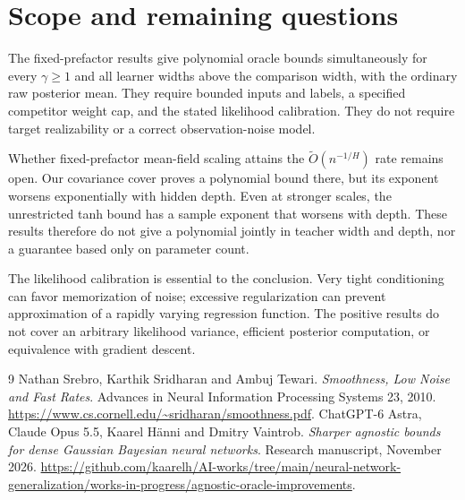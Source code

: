 \documentclass[11pt]{article}
\theoremstyle{remark}\newtheorem{remark}[theorem]{Remark}
\begin{document}















\section{Scope and remaining questions}
The fixed-prefactor results give polynomial oracle bounds simultaneously for every $\gamma\ge1$ and all learner widths above the comparison width, with the ordinary raw posterior mean. They require bounded inputs and labels, a specified competitor weight cap, and the stated likelihood calibration. They do not require target realizability or a correct observation-noise model.

Whether fixed-prefactor mean-field scaling attains the $\widetilde O(n^{-1/H})$ rate remains open. Our covariance cover proves a polynomial bound there, but its exponent worsens exponentially with hidden depth. Even at stronger scales, the unrestricted tanh bound has a sample exponent that worsens with depth. These results therefore do not give a polynomial jointly in teacher width and depth, nor a guarantee based only on parameter count.

The likelihood calibration is essential to the conclusion. Very tight conditioning can favor memorization of noise; excessive regularization can prevent approximation of a rapidly varying regression function. The positive results do not cover an arbitrary likelihood variance, efficient posterior computation, or equivalence with gradient descent.

\appendix


\begin{thebibliography}{9}
Nathan Srebro, Karthik Sridharan and Ambuj Tewari.
\emph{Smoothness, Low Noise and Fast Rates}.
Advances in Neural Information Processing Systems 23, 2010.
\url{https://www.cs.cornell.edu/~sridharan/smoothness.pdf}.
ChatGPT-6 Astra, Claude Opus 5.5, Kaarel H\"anni and Dmitry Vaintrob.
\emph{Sharper agnostic bounds for dense Gaussian Bayesian neural networks}.
Research manuscript, November 2026.
\url{https://github.com/kaarelh/AI-works/tree/main/neural-network-generalization/works-in-progress/agnostic-oracle-improvements}.
\end{thebibliography}
\end{document}
